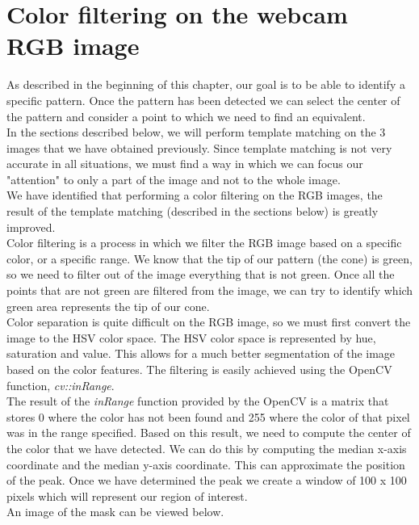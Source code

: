 \section{Color filtering on the webcam RGB image}
\noindent
As described in the beginning of this chapter, our goal is to be able to identify a specific pattern. Once the pattern has been detected we can select the center of the pattern and consider a point to which we need to find an equivalent. 
\\
In the sections described below, we will perform template matching on the 3 images that we have obtained previously. Since template matching is not very accurate in all situations, we must find a way in which we can focus our "attention" to only a part of the image and not to the whole image. 
\\
We have identified that performing a color filtering on the RGB images, the result of the template matching (described in the sections below) is greatly improved.
\\
Color filtering is a process in which we filter the RGB image based on a specific color, or a specific range. We know that the tip of our pattern (the cone) is green, so we need to filter out of the image everything that is not green. Once all the points that are not green are filtered from the image, we can try to identify which green area represents the tip of our cone. 
\\
Color separation is quite difficult on the RGB image, so we must first convert the image to the HSV color space. The HSV color space is represented by hue, saturation and value. This allows for a much better segmentation of the image based on the color features. The filtering is easily achieved using the OpenCV function, \emph{cv::inRange}. 
\\
The result of the \emph{inRange} function provided by the OpenCV is a matrix that stores 0 where the color has not been found and 255 where the color of that pixel was in the range specified. Based on this result, we need to compute the center of the color that we have detected. We can do this by computing the median x-axis coordinate and the median y-axis coordinate. This can approximate the position of the peak. Once we have determined the peak we create a window of 100 x 100 pixels which will represent our region of interest. 
\\
An image of the mask can be viewed below.

